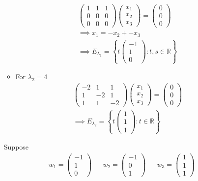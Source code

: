 \begin{enumerate}
\begin{itemize}
\begin{gather}
\begin{pmatrix}
1 & 1 & 1\\
0 & 0 & 0\\
0 & 0 & 0
\end{pmatrix}
\begin{pmatrix}
x_1\\x_2\\x_3
\end{pmatrix}
=
\begin{pmatrix}
0\\0\\0
\end{pmatrix}\\
\implies x_1 = -x_2+-x_3\\
\implies E_{\lambda_1} = \left\{
t\begin{pmatrix}-1\\1\\0\end{pmatrix}\colon t,s \in \mathbb{R}
\right\}
\end{gather}
\item For $\lambda_2 = 4$
\begin{gather}
\begin{pmatrix}
-2 & 1 & 1\\
1 & -2 & 1\\
1 & 1 & -2
\end{pmatrix}
\begin{pmatrix}
x_1\\x_2\\x_3
\end{pmatrix}
=
\begin{pmatrix}
0\\0\\0
\end{pmatrix}\\
\implies E_{\lambda_2} = \left\{
t\begin{pmatrix}1\\1\\1\end{pmatrix}\colon t \in \mathbb{R}
\right\}
\end{gather}
\end{itemize}
Suppose
\begin{align}
w_1 = \begin{pmatrix}-1\\1\\0\end{pmatrix} & & w_2
= \begin{pmatrix}-1\\0\\1\end{pmatrix} & & w_3 =\begin{pmatrix}1\\1\\1\end{pmatrix}

\end{align}
\end{enumerate}
